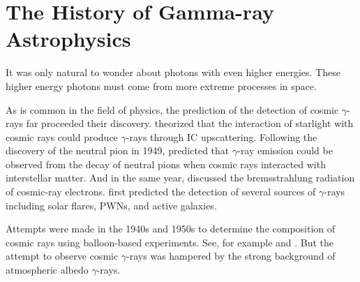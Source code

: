 
\section{The History of Gamma-ray Astrophysics}

It was only natural to wonder about photons with even
higher energies. These higher energy photons must
come from more extreme processes in space.

As is common in the field of physics, the prediction of
the detection of cosmic $\gamma$-rays far proceeded their discovery.
\cite{feenberg_1948_interaction-cosmic-ray} theorized that the interaction
of starlight with cosmic rays could produce $\gamma$-rays through
\ac{IC} upscattering.  Following the discovery of the neutral
pion in 1949, \cite{hayakawa_1952_propagation-cosmic}
predicted that $\gamma$-ray emission could be observed from the
decay of neutral pions when cosmic rays interacted with interstellar
matter.  And in the same year, \cite{hutchinson_1952_possible-relation}
discussed the bremsstrahlung radiation of cosmic-ray electrons.
\cite{morrison_1958_gamma-ray-astronomy} first predicted the detection
of several sources of $\gamma$-rays including solar flares, \acp{PWN},
and active galaxies.

Attempts were made in the 1940s and 1950s to determine the
composition of cosmic rays using balloon-based experiments. See,
for example \cite{critchfield_1952_radiation-balloon} and
\cite{hulsizer_1948_search-electrons}.  But the attempt to observe
cosmic $\gamma$-rays was hampered by the strong background of atmospheric
albedo $\gamma$-rays.

